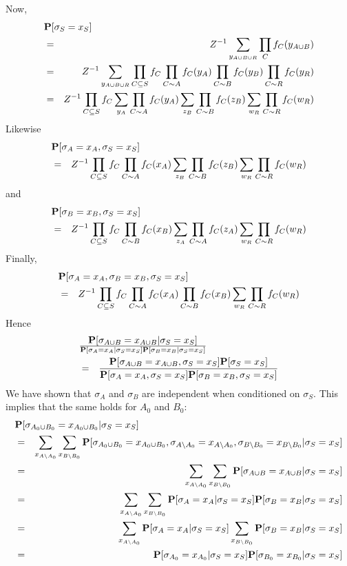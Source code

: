 \documentclass[11pt]{article} \usepackage{amssymb}
\begin{document}
Now,
\begin{eqnarray*}
  \lefteqn{\P[\sigma_S=x_S]}
\\ &=& Z^{-1}\sum_{y_{A\cup B\cup R}}\prod_Cf_C(y_{A\cup B})
\\ &=& Z^{-1}\sum_{y_{A\cup B\cup R}}\prod_{C\subseteq S}f_C\prod_{C\sim A}f_C(y_A)\prod_{C\sim B}f_C(y_B)\prod_{C\sim R}f_C(y_R)
\\ &=& Z^{-1}\prod_{C\subseteq S}f_C\sum_{y_A}\prod_{C\sim A}f_C(y_A)\sum_{z_B}\prod_{C\sim B}f_C(z_B)\sum_{w_R}\prod_{C\sim R}f_C(w_R)
\end{eqnarray*}
Likewise
\begin{eqnarray*}
  \lefteqn{\P[\sigma_A=x_A,\sigma_S=x_S]}
\\ &=& Z^{-1}\prod_{C\subseteq S}f_C\prod_{C\sim A}f_C(x_A)\sum_{z_B}\prod_{C\sim B}f_C(z_B)\sum_{w_R}\prod_{C\sim R}f_C(w_R)
\end{eqnarray*}
and
\begin{eqnarray*}
  \lefteqn{\P[\sigma_B=x_B,\sigma_S=x_S]}
\\ &=& Z^{-1}\prod_{C\subseteq S}f_C\prod_{C\sim B}f_C(x_B)\sum_{z_A}\prod_{C\sim A}f_C(z_A)\sum_{w_R}\prod_{C\sim R}f_C(w_R)
\end{eqnarray*}
Finally,
\begin{eqnarray*}
  \lefteqn{\P[\sigma_A=x_A,\sigma_B=x_B,\sigma_S=x_S]}
\\ &=& Z^{-1}\prod_{C\subseteq S}f_C\prod_{C\sim A}f_C(x_A)\prod_{C\sim B}f_C(x_B)\sum_{w_R}\prod_{C\sim R}f_C(w_R)
\end{eqnarray*}
Hence
\begin{eqnarray*}
\lefteqn{\P[\sigma_{A\cup B}=x_{A\cup B}|\sigma_S=x_S]\over  
    \P[\sigma_A=x_A|\sigma_S=x_S]\P[\sigma_B=x_B|\sigma_S=x_S]}
\\  &=&   {\P[\sigma_{A\cup B}=x_{A\cup B},\sigma_S=x_S]\P[\sigma_S=x_S]\over  
    \P[\sigma_A=x_A,\sigma_S=x_S]\P[\sigma_B=x_B,\sigma_S=x_S]}
\end{eqnarray*}
We have shown that $\sigma_A$ and $\sigma_B$ are independent when conditioned
on $\sigma_S$. This implies that the same holds for $A_0$ and $B_0$:
\begin{eqnarray*}
\lefteqn{\P[\sigma_{A_0\cup B_0}=x_{A_0\cup B_0}|\sigma_S=x_S]}
\\ &=& 
\sum_{x_{A\setminus A_0}}\sum_{x_{B\setminus B_0}}\P[\sigma_{A_0\cup B_0}=x_{A_0\cup B_0},\sigma_{A\setminus A_0}=x_{A\setminus A_0},\sigma_{B\setminus B_0}=x_{B\setminus B_0}|\sigma_S=x_S]
\\ &=& \sum_{x_{A\setminus A_0}}\sum_{x_{B\setminus B_0}}\P[\sigma_{A\cup B}=x_{A\cup B}|\sigma_S=x_S]
\\ &=& \sum_{x_{A\setminus A_0}}\sum_{x_{B\setminus B_0}}\P[\sigma_A=x_A|\sigma_S=x_S]\P[\sigma_B=x_B|\sigma_S=x_S]
\\ &=& \sum_{x_{A\setminus A_0}}\P[\sigma_A=x_A|\sigma_S=x_S]\sum_{x_{B\setminus B_0}}\P[\sigma_B=x_B|\sigma_S=x_S]
\\ &=& \P[\sigma_{A_0}=x_{A_0}|\sigma_S=x_S]\P[\sigma_{B_0}=x_{B_0}|\sigma_S=x_S]
\end{eqnarray*}
\end{document}
